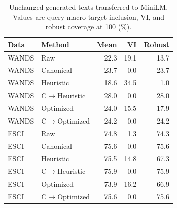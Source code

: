 \begin{table}[t]\caption{Unchanged generated texts transferred to MiniLM. Values are query-macro target inclusion, VI, and robust coverage at 100 (\%).}\label{tab:opttransfer}\centering\scriptsize
\begin{tabular}{llrrr}\toprule Data&Method&Mean&VI&Robust\\\midrule
WANDS & Raw & 22.3 & 19.1 & 13.7\\
WANDS & Canonical & 23.7 & 0.0 & 23.7\\
WANDS & Heuristic & 18.6 & 34.5 & 1.0\\
WANDS & C$\to$Heuristic & 28.0 & 0.0 & 28.0\\
WANDS & Optimized & 24.0 & 15.5 & 17.9\\
WANDS & C$\to$Optimized & 24.2 & 0.0 & 24.2\\
ESCI & Raw & 74.8 & 1.3 & 74.3\\
ESCI & Canonical & 75.6 & 0.0 & 75.6\\
ESCI & Heuristic & 75.5 & 14.8 & 67.3\\
ESCI & C$\to$Heuristic & 75.9 & 0.0 & 75.9\\
ESCI & Optimized & 73.9 & 16.2 & 66.9\\
ESCI & C$\to$Optimized & 75.6 & 0.0 & 75.6\\
\bottomrule\end{tabular}\end{table}
